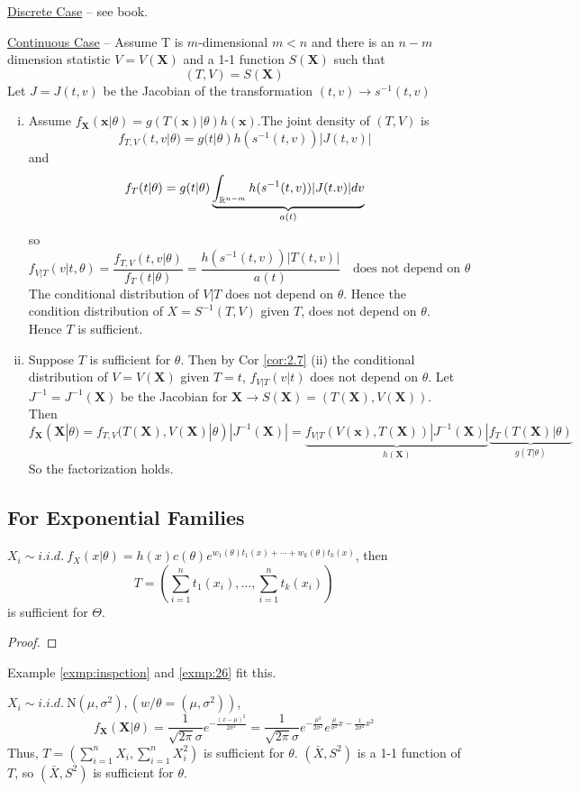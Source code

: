 \documentclass[english, 11pt]{article}
\begin{document}
\underline{Discrete Case} -- see book.

\underline{Continuous Case} -- Assume T is $m$-dimensional $m<n$ and there is an $n-m$ dimension statistic $V=V(\bm{X})$ and a 1-1 function $S(\bm{X})$ such that 
$$
(T, V)=S(\bm{X})
$$
Let $J=J(t, v)$ be the Jacobian of the  transformation $(t, v)\rightarrow s^{-1}(t, v)$

\begin{enumerate}[i).]
\item Assume $f_{\bm{X}}(\bm{x}|\theta)=g(T(\bm{x})|\theta)h(\bm{x})$.The joint density of $(T, V)$ is
$$
f_{T, V}(t, v|\theta)=g(t|\theta)h(s^{-1}(t, v))|J(t, v)|
$$
and 
$$
f_T(t|\theta)=g(t|\theta)\underbrace{\int_{{\mathbb{R}}^{n-m}}h(s^{-1}(t, v))|J(t.v)|dv}_{a(t)}
$$
so
$$
f_{V|T}(v|t, \theta)=\frac{f_{T,V}(t, v|\theta)}{f_T(t|\theta)}=\frac{h(s^{-1}(t, v))|T(t, v)|}{a(t)}\quad \text{does not depend on $\theta$}
$$
The conditional distribution of $V|T$ does not depend on $\theta$. Hence the condition distribution of $X=S^{-1}(T,V)$ given $T$, does not depend on $\theta$. Hence $T$ is sufficient.
\item Suppose $T$ is sufficient for $\theta$. Then by Cor \ref{cor:2.7} (ii) the conditional distribution of $V=V(\bm{X})$ given $T=t$, $f_{V|T}(v|t)$ does not depend on $\theta$. Let $J^{-1}=J^{-1}(\bm{X})$ be  the Jacobian for $\bm{X}\rightarrow S(\bm{X})=(T(\bm{X}), V(\bm{X}))$. Then 
$$
f_{\bm{X}}(\bm{X}|\theta)=f_{T,V}(T(\bm{X}), V(\bm{X})|\theta)|J^{-1}(\bm{X})|=\underbrace{f_{V|T}(V(\bm{x}), T(\bm{X}))|J^{-1}(\bm{X})|}_{h(\bm{X})}\underbrace{f_T(T(\bm{X})|\theta)}_{g(T|\theta)}
$$
So the factorization holds.
\end{enumerate}


\subsection{For Exponential Families}
\begin{thrm}\label{thrm:211}
$X_i\sim i.i.d. ~f_X(x|\theta)=h(x)c(\theta)e^{w_1(\theta)t_1(x)+\cdots+w_k(\theta)t_k(x)}$, then
$$
T=\left(\sum_{i=1}^nt_1(x_i), \dots, \sum_{i=1}^nt_k(x_i)\right)
$$
is sufficient for $\Theta$.
\end{thrm}
\begin{proof}
\end{proof}

Example \ref{exmp:inspction} and \ref{exmp:26} fit this.

\begin{exmp}\label{exmp:212}
$X_i\sim i.i.d.~\text{N}(\mu, \sigma^2), (w/\theta=(\mu, \sigma^2))$, 
$$
f_{\bm{X}}(\bm{X}|\theta)=\frac{1}{\sqrt{2\pi}\sigma}e^{-\frac{(x-\mu)^2}{2\sigma^2}}=\frac{1}{\sqrt{2\pi}\sigma}e^{-\frac{\mu^2}{2\sigma^2}}e^{\frac{\mu}{\sigma^2}x-\frac{1}{2\sigma^2}x^2}
$$
Thus, $T=(\sum_{i=1}^nX_i, \sum_{i=1}^nX_i^2)$ is sufficient for $\theta$. $(\bar{X}, S^2)$ is a 1-1 function of $T$, so $(\bar{X}, S^2)$ is sufficient for $\theta$.
\end{exmp}
\end{document}
